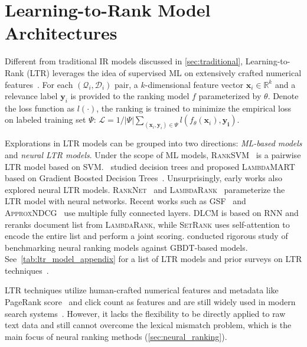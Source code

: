\section{Learning-to-Rank Model Architectures}
\label{sec:ltr}
Different from traditional IR models discussed in \cref{sec:traditional}, Learning-to-Rank (LTR) %
leverages the idea of supervised ML on extensively crafted numerical features~\cite{burges2005learning,burges2010ranknet,qin2013mslr}. 
For each $(\mathcal{Q}_i, \mathcal{D}_i)$ pair, a $k$-dimensional feature vector $\mathbf{x}_i \in \mathbb{R}^{k}$ and a relevance label $\mathbf{y}_i$ is provided to the ranking model $f$ parameterized by $\theta$. Denote the loss function as $l(\cdot)$, the ranking is trained to minimize the empirical loss on labeled training set $\Psi$: 
$\mathcal{L} = 1 / |\Psi| \sum_{(\mathbf{x}_i, \mathbf{y}_i) \in \Psi} l(f_{\theta}(\mathbf{x}_i), \mathbf{y_i}). $

Explorations in LTR models can be grouped into two directions: 
\textit{ML-based models} and \textit{neural LTR models}.
Under the scope of ML models, \textsc{RankSVM}~\cite{joachims2006training} is a pairwise LTR model based on \textsc{SVM}.~\citet{burges2005learning} studied decision trees and \citet{wu2010adapting} proposed \textsc{LambdaMART} based on Gradient Boosted Decision Trees~\cite[\textsc{GBDT},][]{friedman2001greedy,ke2017lightgbm}. 
Unsurprisingly, early works also explored neural LTR models. \textsc{RankNet}~\cite{burges2005learning} and \textsc{LambdaRank}~\cite{burges2006learning} parameterize the LTR model with neural networks.
Recent works such as \textsc{GSF}~\cite{ai2019learning} and \textsc{ApproxNDCG}~\cite{bruch2019revisiting} use multiple fully connected layers. \textsc{DLCM} is based on RNN and reranks document list from \textsc{LambdaRank}, while \textsc{SetRank} uses self-attention to encode the entire list and perform a joint scoring. \citet{qin2021neural} conducted rigorous study of benchmarking neural ranking models against \textsc{GBDT}-based models. 
See~\cref{tab:ltr_model_appendix} for a list of LTR models and prior surveys on LTR techniques~\cite{liu2009ltr,li2011learning}.

LTR techniques utilize human-crafted numerical features and metadata like PageRank score~\cite{brin1998anatomy} and click count as features and are still widely used in modern search systems~\cite{google2019search}. However, it lacks the flexibility to be directly applied to raw text data and still cannot overcome the lexical mismatch problem, which is the main focus of neural ranking methods (\cref{sec:neural_ranking}).
